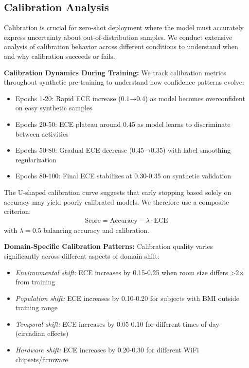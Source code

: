 \documentclass[journal]{IEEEtran}
\begin{document}
\subsection{Calibration Analysis}
Calibration is crucial for zero-shot deployment where the model must accurately express uncertainty about out-of-distribution samples. We conduct extensive analysis of calibration behavior across different conditions to understand when and why calibration succeeds or fails.

\textbf{Calibration Dynamics During Training:}
We track calibration metrics throughout synthetic pre-training to understand how confidence patterns evolve:
\begin{itemize}
\item Epochs 1-20: Rapid ECE increase (0.1→0.4) as model becomes overconfident on easy synthetic samples
\item Epochs 20-50: ECE plateau around 0.45 as model learns to discriminate between activities
\item Epochs 50-80: Gradual ECE decrease (0.45→0.35) with label smoothing regularization
\item Epochs 80-100: Final ECE stabilizes at 0.30-0.35 on synthetic validation
\end{itemize}

The U-shaped calibration curve suggests that early stopping based solely on accuracy may yield poorly calibrated models. We therefore use a composite criterion:
\begin{align}
\text{Score} = \text{Accuracy} - \lambda \cdot \text{ECE}
\end{align}
with $\lambda = 0.5$ balancing accuracy and calibration.

\textbf{Domain-Specific Calibration Patterns:}
Calibration quality varies significantly across different aspects of domain shift:
\begin{itemize}
\item \textit{Environmental shift:} ECE increases by 0.15-0.25 when room size differs >2× from training
\item \textit{Population shift:} ECE increases by 0.10-0.20 for subjects with BMI outside training range
\item \textit{Temporal shift:} ECE increases by 0.05-0.10 for different times of day (circadian effects)
\item \textit{Hardware shift:} ECE increases by 0.20-0.30 for different WiFi chipsets/firmware
\end{itemize}
\end{document}
